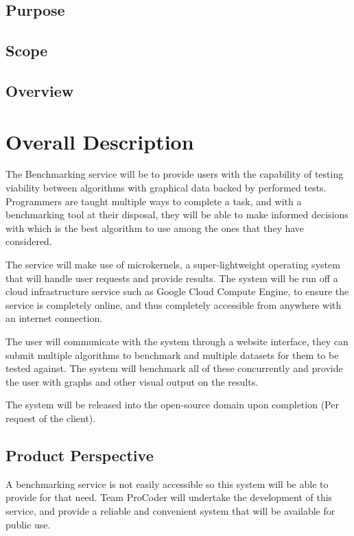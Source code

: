 \documentclass[runningheads,a4paper]{article}
\begin{document}
\subsection{Purpose}
\subsection{Scope}
\subsection{Overview}

\section{Overall Description}
	The Benchmarking service will be to provide users with the capability of testing viability between algorithms with graphical data backed by performed tests. Programmers are taught multiple ways to complete a task, and with a benchmarking tool at their disposal, they will be able to make informed decisions with which is the best algorithm to use among the ones that they have considered. \newline
	
	The service will make use of microkernels, a super-lightweight operating system that will handle user requests and provide results. The system will be run off a cloud infrastructure service such as Google Cloud Compute Engine, to ensure the service is completely online, and thus completely accessible from anywhere with an internet connection. \newline
	
	The user will communicate with the system through a website interface, they can submit multiple algorithms to benchmark and multiple datasets for them to be tested against. The system will benchmark all of these concurrently and provide the user with graphs and other visual output on the results. \newline
	
	The system will be released into the open-source domain upon completion (Per request of the client). \newline

	\subsection{Product Perspective}
		A benchmarking service is not easily accessible so this system will be able to provide for that need. Team ProCoder will undertake the development of this service, and provide a reliable and convenient system that will be available for public use. \newline
		
\end{document}
